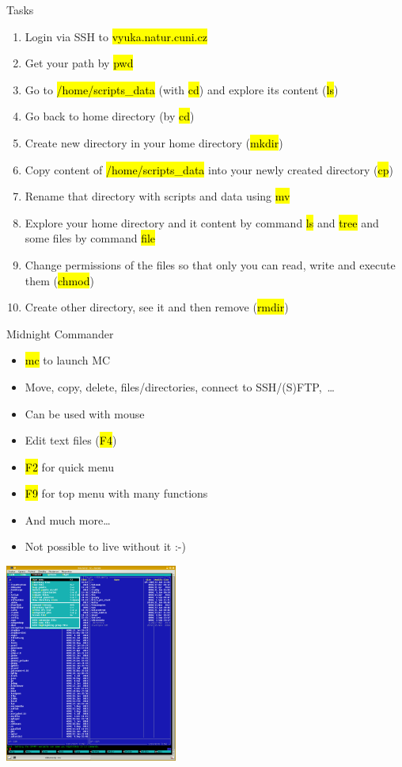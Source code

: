 \documentclass[compress, ucs, xelatex, 11pt, xcolor=svgnames,
  hyperref={
    bookmarks=true,
    unicode=true,
    colorlinks=true,
    pdftitle={Linux, command line and MetaCentrum},
    plainpages=false,
    pdfauthor={Vojtech Zeisek},
    pdfsubject={Course about use of Linux command line, writing shell scripts and using MetaCentrum of CESNET},
    pdfcreator={XeLaTeX},
    pdfkeywords={Linux, GNU, BASH, shell, command line, MetaCentrum},
    linkcolor=DarkRed,
    anchorcolor=DarkBlue,
    citecolor=Indigo,
    filecolor=NavyBlue,
    menucolor=DarkMagenta,
    urlcolor=DarkBlue,
    pdftex},
  url={hyphens, lowtilde} %
  ]{beamer}
\renewcommand{\texttt}[1]{\hl{\ttfamily #1}}
\begin{document}
\begin{frame}{Tasks}
  \begin{enumerate}
    \item Login via SSH to \texttt{vyuka.natur.cuni.cz}
    \item Get your path by \texttt{pwd}
    \item Go to \texttt{/home/scripts\_data} (with \texttt{cd}) and explore its content (\texttt{ls})
    \item Go back to home directory (by \texttt{cd})
    \item Create new directory in your home directory (\texttt{mkdir})
    \item Copy content of \texttt{/home/scripts\_data} into your newly created directory (\texttt{cp})
    \item Rename that directory with scripts and data using \texttt{mv}
    \item Explore your home directory and it content by command \texttt{ls} and \texttt{tree} and some files by command \texttt{file}
    \item Change permissions of the files so that only you can read, write and execute them (\texttt{chmod})
    \item Create other directory, see it and then remove (\texttt{rmdir})
  \end{enumerate}
\end{frame}

\begin{frame}{Midnight Commander}
  \begin{multicols}{2}
    \begin{itemize}
      \item \texttt{mc} to launch MC
      \item Move, copy, delete, files/directories, connect to SSH/(S)FTP,~\ldots
      \item Can be used with mouse
      \item Edit text files (\texttt{F4})
      \item \texttt{F2} for quick menu
      \item \texttt{F9} for top menu with many functions
      \item And much more\ldots
      \item Not possible to live without it :-)
    \end{itemize}
    \includegraphics[height=6.5cm]{mc.png}
  \end{multicols}
\end{frame}
\end{document}
